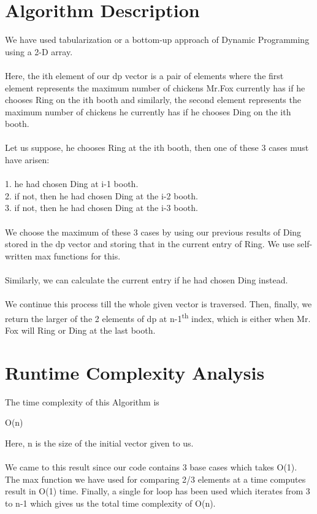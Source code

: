 \documentclass{article}
\begin{document}
\section{Algorithm Description}
We have used tabularization or a bottom-up approach of Dynamic Programming using a 2-D array.\\\\
Here, the ith element of our dp vector is a pair of elements where the first element represents the maximum number of chickens Mr.Fox currently has if he chooses Ring on the ith booth and similarly, the second element represents the maximum number of chickens he currently has if he chooses Ding on the ith booth.
\\\\
Let us suppose, he chooses Ring at the ith booth, then one of these 3 cases must have arisen:
\\
\\1. he had chosen Ding at i-1 booth.
\\2. if not, then he had chosen Ding at the i-2 booth.
\\3. if not, then he had chosen Ding at the i-3 booth.
\\\\
We choose the maximum of these 3 cases by using our previous results of Ding stored in the dp vector and storing that in the current entry of Ring. We use self-written max functions for this.
\\\\
Similarly, we can calculate the current entry if he had chosen Ding instead.
\\\\
We continue this process till the whole given vector is traversed. Then, finally, we return the larger of the 2 elements of dp at n-1\textsuperscript{th} index, which is either when Mr. Fox will Ring or Ding at the last booth.

\section{Runtime Complexity Analysis}
The time complexity of this Algorithm is
\begin{center}
O(n)
\end{center}
Here, n is the size of the initial vector given to us.\\
\\We came to this result since our code contains 3 base cases which takes O(1). The max function we have used for comparing 2/3 elements at a time computes result in O(1) time. Finally, a single for loop has been used which iterates from 3 to n-1 which gives us the total time complexity of O(n).
\end{document}
